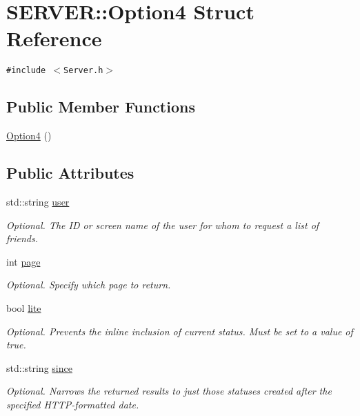 \hypertarget{structSERVER_1_1Option4}{
\section{SERVER::Option4 Struct Reference}
\label{structSERVER_1_1Option4}
}
{\tt \#include $<$Server.h$>$}

\subsection*{Public Member Functions}
\begin{CompactItemize}
\item 
\hyperlink{structSERVER_1_1Option4_b641f3c3122d862af9d365ff219f7219}{Option4} ()
\end{CompactItemize}
\subsection*{Public Attributes}
\begin{CompactItemize}
\item 
std::string \hyperlink{structSERVER_1_1Option4_3ba9825ad8182388e55c978bf9b1867f}{user}
\begin{CompactList}\small\item\em Optional. The ID or screen name of the user for whom to request a list of friends. \item\end{CompactList}\item 
int \hyperlink{structSERVER_1_1Option4_f93ca2adc6bbaef592b92364c492a97d}{page}
\begin{CompactList}\small\item\em Optional. Specify which page to return. \item\end{CompactList}\item 
bool \hyperlink{structSERVER_1_1Option4_d5cb29165acf0bef7d33e2b1bbd034a1}{lite}
\begin{CompactList}\small\item\em Optional. Prevents the inline inclusion of current status. Must be set to a value of true. \item\end{CompactList}\item 
std::string \hyperlink{structSERVER_1_1Option4_4d7eaf322b263a5a82cc9010e24def48}{since}
\begin{CompactList}\small\item\em Optional. Narrows the returned results to just those statuses created after the specified HTTP-formatted date. \item\end{CompactList}\end{CompactItemize}


